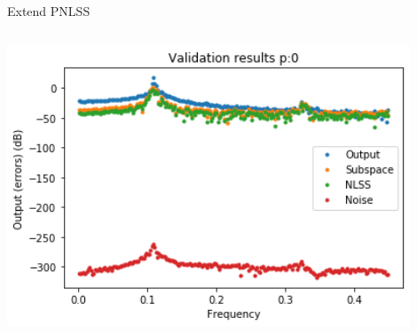 \documentclass[9pt]{beamer}
\begin{document}
\begin{frame}{Extend PNLSS}
\begin{columns}
\begin{column}{0.5\textwidth}
\begin{center}
        \includegraphics[width=0.9\textwidth]{fig/nlss_tahn_E10}
      \end{center}
    \end{column}
  \end{columns}
\end{frame}
\end{document}
